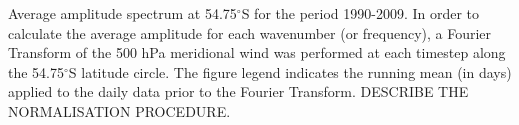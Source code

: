\label{fig:fourier_spectrum}
Average amplitude spectrum at 54.75$^{\circ}$S for the period 1990-2009. In order to calculate the average amplitude for each wavenumber (or frequency), a Fourier Transform of the 500 hPa meridional wind was performed at each timestep along the 54.75$^{\circ}$S latitude circle. The figure legend indicates the running mean (in days) applied to the daily data prior to the Fourier Transform. DESCRIBE THE NORMALISATION PROCEDURE.  